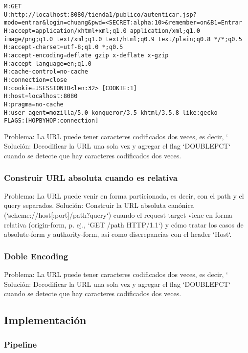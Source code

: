 \documentclass[12pt,oneside,a4paper]{report}
\begin{document}
\begin{verbatim}
M:GET
U:http://localhost:8080/tienda1/publico/autenticar.jsp?modo=entrar&login=chuang&pwd=<SECRET:alpha:10>&remember=on&B1=Entrar
H:accept=application/xhtml+xml;q1.0 application/xml;q1.0 image/png;q1.0 text/xml;q1.0 text/html;q0.9 text/plain;q0.8 */*;q0.5
H:accept-charset=utf-8;q1.0 *;q0.5
H:accept-encoding=deflate gzip x-deflate x-gzip
H:accept-language=en;q1.0
H:cache-control=no-cache
H:connection=close
H:cookie=JSESSIONID<len:32> [COOKIE:1]
H:host=localhost:8080
H:pragma=no-cache
H:user-agent=mozilla/5.0 konqueror/3.5 khtml/3.5.8 like:gecko
FLAGS:[HOPBYHOP:connection]
\end{verbatim}

Problema: La URL puede tener caracteres codificados dos veces, es decir, `%
Solución: Decodificar la URL una sola vez y agregar el flag `DOUBLEPCT` cuando se detecte que hay caracteres codificados dos veces.
\subsubsection{Construir URL absoluta cuando es relativa}
Problema: La URL puede venir en forma particionada, es decir, con el path y el query separados.
Solución: Construir la URL absoluta canónica (`scheme://host[:port]/path?query`) cuando el request target viene en forma relativa (origin-form, p. ej., `GET /path HTTP/1.1`) y cómo tratar los casos de absolute-form y authority-form, así como discrepancias con el header `Host`.
\subsubsection{Doble Encoding}
Problema: La URL puede tener caracteres codificados dos veces, es decir, `%
Solución: Decodificar la URL una sola vez y agregar el flag `DOUBLEPCT` cuando se detecte que hay caracteres codificados dos veces.



\subsection{Implementación}
\subsubsection{Pipeline}
\end{document}
